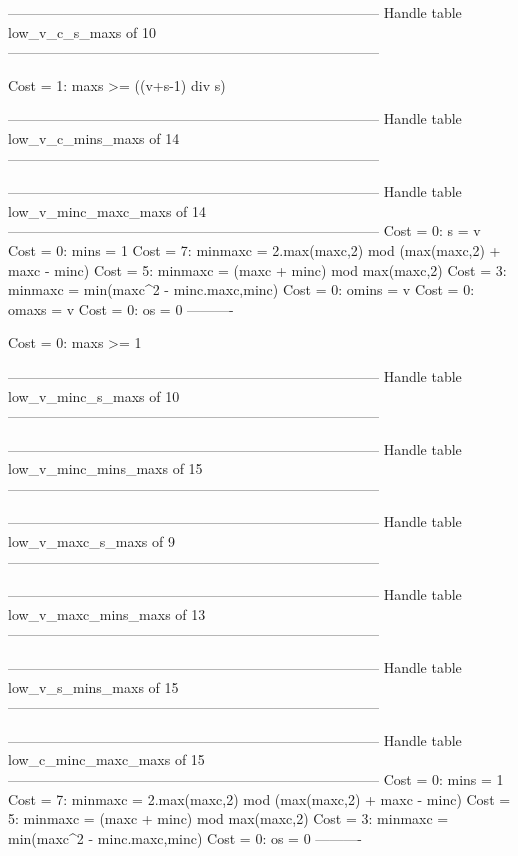 --------------------------------------------------------------------------------
Handle table low_v_c_s_maxs of 10
--------------------------------------------------------------------------------

Cost =  1:  maxs >= ((v+s-1) div s)

--------------------------------------------------------------------------------
Handle table low_v_c_mins_maxs of 14
--------------------------------------------------------------------------------


--------------------------------------------------------------------------------
Handle table low_v_minc_maxc_maxs of 14
--------------------------------------------------------------------------------
Cost =  0:  s       = v
Cost =  0:  mins    = 1
Cost =  7:  minmaxc = 2.max(maxc,2) mod (max(maxc,2) + maxc - minc)
Cost =  5:  minmaxc = (maxc + minc) mod max(maxc,2)
Cost =  3:  minmaxc = min(maxc^2 - minc.maxc,minc)
Cost =  0:  omins   = v
Cost =  0:  omaxs   = v
Cost =  0:  os      = 0
----------

Cost =  0:  maxs >= 1

--------------------------------------------------------------------------------
Handle table low_v_minc_s_maxs of 10
--------------------------------------------------------------------------------


--------------------------------------------------------------------------------
Handle table low_v_minc_mins_maxs of 15
--------------------------------------------------------------------------------


--------------------------------------------------------------------------------
Handle table low_v_maxc_s_maxs of 9
--------------------------------------------------------------------------------


--------------------------------------------------------------------------------
Handle table low_v_maxc_mins_maxs of 13
--------------------------------------------------------------------------------


--------------------------------------------------------------------------------
Handle table low_v_s_mins_maxs of 15
--------------------------------------------------------------------------------


--------------------------------------------------------------------------------
Handle table low_c_minc_maxc_maxs of 15
--------------------------------------------------------------------------------
Cost =  0:  mins    = 1
Cost =  7:  minmaxc = 2.max(maxc,2) mod (max(maxc,2) + maxc - minc)
Cost =  5:  minmaxc = (maxc + minc) mod max(maxc,2)
Cost =  3:  minmaxc = min(maxc^2 - minc.maxc,minc)
Cost =  0:  os      = 0
----------


